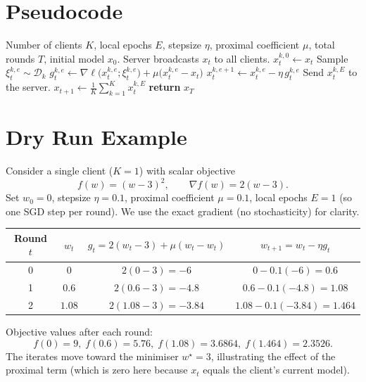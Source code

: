 \documentclass[11pt]{article}
\begin{document}
\section*{Pseudocode}
\begin{algorithm}[H]
\caption{FedProx}
\begin{algorithmic}[1]
\Require Number of clients $K$, local epochs $E$, stepsize $\eta$,
 proximal coefficient $\mu$, total rounds $T$, initial model $x_0$.
    \State Server broadcasts $x_t$ to all clients.
        \State $x^{k,0}_t \gets x_t$
            \State Sample $\xi^{k,e}_t\sim\mathcal{D}_k$
            \State $g^{k,e}_t \gets \nabla\ell\big(x^{k,e}_t;\xi^{k,e}_t\big)
                     +\mu\big(x^{k,e}_t-x_t\big)$
            \State $x^{k,e+1}_t \gets x^{k,e}_t - \eta\, g^{k,e}_t$
        \EndFor
        \State Send $x^{k,E}_t$ to the server.
    \EndFor
    \State $x_{t+1}\gets \frac1K\sum_{k=1}^{K}x^{k,E}_t$
\EndFor
\State \textbf{return} $x_T$
\end{algorithmic}
\end{algorithm}

\section*{Dry Run Example}
Consider a single client ($K=1$) with scalar objective
\[
  f(w)=(w-3)^2,\qquad \nabla f(w)=2(w-3).
\]
Set $w_0=0$, stepsize $\eta=0.1$, proximal coefficient $\mu=0.1$,
local epochs $E=1$ (so one SGD step per round).  
We use the exact gradient (no stochasticity) for clarity.

\begin{tabular}{c|c|c|c}
\textbf{Round $t$} & $w_t$ & $g_t=2(w_t-3)+\mu(w_t-w_t)$ & $w_{t+1}=w_t-\eta g_t$\\
\hline
0 & $0$ & $2(0-3)=-6$ & $0-0.1(-6)=0.6$\\
1 & $0.6$ & $2(0.6-3)=-4.8$ & $0.6-0.1(-4.8)=1.08$\\
2 & $1.08$ & $2(1.08-3)=-3.84$ & $1.08-0.1(-3.84)=1.464$\\
\end{tabular}

Objective values after each round:
\[
f(0)=9,\; f(0.6)=5.76,\; f(1.08)=3.6864,\; f(1.464)=2.3526.
\]
The iterates move toward the minimiser $w^\star=3$, illustrating the
effect of the proximal term (which is zero here because $x_t$ equals the
client’s current model).
\end{document}
